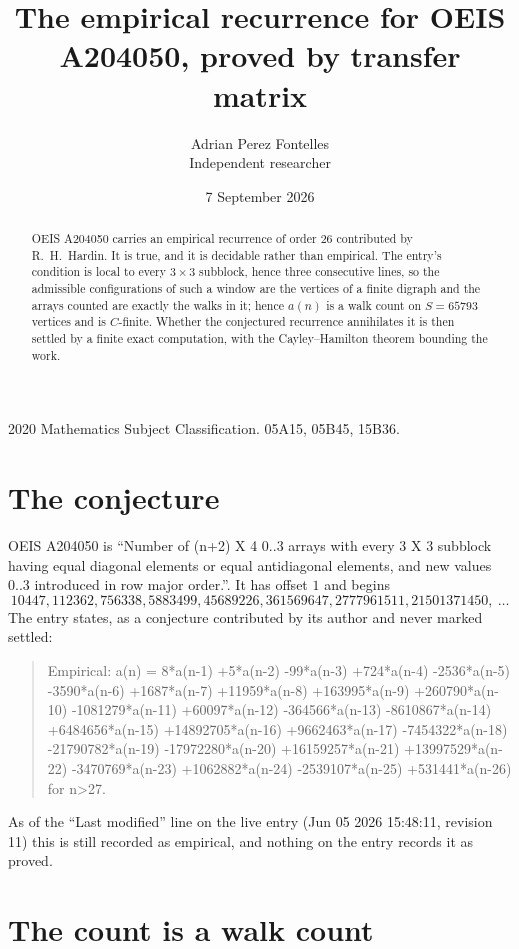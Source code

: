 \documentclass[11pt,a4paper]{article}
\title{The empirical recurrence for OEIS A204050, proved by transfer matrix}
\author{Adrian Perez Fontelles\\ \small Independent researcher}
\date{7 September 2026}
\theoremstyle{plain}
\theoremstyle{definition}
\begin{document}
\maketitle

\begin{abstract}
OEIS A204050 carries an empirical recurrence of order $26$ contributed by R.~H.~Hardin. It is
true, and it is decidable rather than empirical. The entry's condition is local to every $3\times3$ subblock, hence three consecutive lines, so
the admissible configurations of such a window are the vertices of a finite digraph and the
arrays counted are exactly the walks in it; hence $a(n)$ is a walk count on $S=65793$ vertices
and is $C$-finite. Whether the conjectured recurrence annihilates it is then settled by a
finite exact computation, with the Cayley--Hamilton theorem bounding the work.
\end{abstract}

\noindent\small 2020 Mathematics Subject Classification. 05A15, 05B45, 15B36.\normalsize

\section{The conjecture}

OEIS A204050 is ``Number of (n+2) X 4 0..3 arrays with every 3 X 3 subblock having equal diagonal elements or equal antidiagonal elements, and new values 0..3 introduced in row major order.''. It has offset $1$ and begins
\[
10447, 112362, 756338, 5883499, 45689226, 361569647, 2777961511, 21501371450,\ \dots
\]
The entry states, as a conjecture contributed by its author and never marked settled:
\begin{quote}
Empirical: a(n) = 8*a(n-1) +5*a(n-2) -99*a(n-3) +724*a(n-4) -2536*a(n-5) -3590*a(n-6) +1687*a(n-7) +11959*a(n-8) +163995*a(n-9) +260790*a(n-10) -1081279*a(n-11) +60097*a(n-12) -364566*a(n-13) -8610867*a(n-14) +6484656*a(n-15) +14892705*a(n-16) +9662463*a(n-17) -7454322*a(n-18) -21790782*a(n-19) -17972280*a(n-20) +16159257*a(n-21) +13997529*a(n-22) -3470769*a(n-23) +1062882*a(n-24) -2539107*a(n-25) +531441*a(n-26) for n>27.
\end{quote}
As of the ``Last modified'' line on the live entry (Jun 05 2026 15:48:11, revision 11) this is still
recorded as empirical, and nothing on the entry records it as proved.

\section{The count is a walk count}
\end{document}
